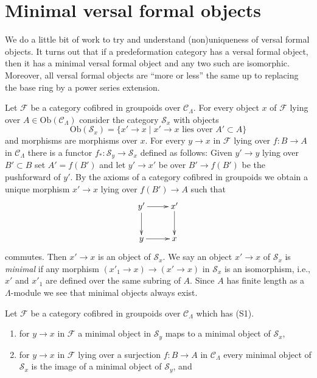 




\section{Minimal versal formal objects}
\label{section-minimal-versal}

\noindent
We do a little bit of work to try and understand (non)uniqueness
of versal formal objects. It turns out that if a predeformation category
has a versal formal object, then it has a minimal versal formal
object and any two such are isomorphic. Moreover, all versal formal
objects are ``more or less'' the same up to replacing the base ring
by a power series extension.

\medskip\noindent
Let $\mathcal{F}$ be a category cofibred in groupoids over
$\mathcal{C}_\Lambda$. For every object $x$ of $\mathcal{F}$
lying over $A \in \text{Ob}(\mathcal{C}_\Lambda)$ consider the
category $\mathcal{S}_x$ with objects
$$
\text{Ob}(\mathcal{S}_x) =
\{x' \to x \mid x' \to x\text{ lies over }A' \subset A\}
$$
and morphisms are morphisms over $x$. For every $y \to x$ in
$\mathcal{F}$ lying over $f : B \to A$
in $\mathcal{C}_\Lambda$ there is a functor
$f_* : \mathcal{S}_y \to \mathcal{S}_x$ defined as follows:
Given $y' \to y$ lying over $B' \subset B$ set $A' = f(B')$
and let $y' \to x'$ be over $B' \to f(B')$ be the pushforward of $y'$.
By the axioms of a category cofibred in groupoids we obtain a
unique morphism $x' \to x$ lying over $f(B') \to A$ such that
$$
\xymatrix{
y' \ar[d] \ar[r] & x' \ar[d] \\
y \ar[r] & x
}
$$
commutes. Then $x' \to x$ is an object of $\mathcal{S}_x$. We say an
object $x' \to x$ of $\mathcal{S}_x$ is {\it minimal} if any morphism
$(x'_1 \to x) \to (x' \to x)$ in $\mathcal{S}_x$ is an isomorphism, i.e.,
$x'$ and $x'_1$ are defined over the same subring of $A$. Since
$A$ has finite length as a $\Lambda$-module we see that minimal objects
always exist.

\begin{lemma}
\label{lemma-smallest-where-descends}
Let $\mathcal{F}$ be a category cofibred in groupoids over
$\mathcal{C}_\Lambda$ which has (S1).
\begin{enumerate}
\item for $y \to x$ in $\mathcal{F}$ a minimal
object in $\mathcal{S}_y$ maps to a minimal object of $\mathcal{S}_x$,
\item for $y \to x$ in $\mathcal{F}$ lying over a surjection
$f : B \to A$ in $\mathcal{C}_\Lambda$ every minimal object
of $\mathcal{S}_x$ is the image of a minimal object of
$\mathcal{S}_y$, and
\end{enumerate}
\end{lemma}

